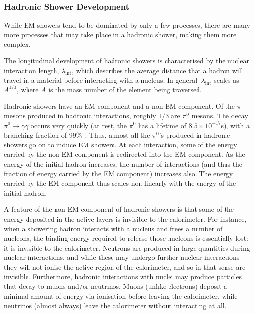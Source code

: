 \subsubsection{Hadronic Shower Development}
\label{detector_had_showers}
While EM showers tend to be dominated by only a few processes, there are many more processes that may take place in a hadronic shower, making them more complex. 

The longitudinal development of hadronic showers is characterised by the nuclear interaction length, $\lambda_\mathrm{int}$, which describes the average distance that a hadron will travel in a material before interacting with a nucleus. In general, $\lambda_\mathrm{int}$ scales as $A^{1/3}$, where $A$ is the mass number of the element being traversed.

Hadronic showers have an EM component and a non-EM component. Of the $\pi$ mesons produced in hadronic interactions, roughly 1/3 are $\pi^0$ mesons. The decay $\pi^0 \rightarrow \gamma \gamma$ occurs very quickly (at rest, the $\pi^0$ has a lifetime of $8.5 \times 10^{-17}$s), with a branching fraction of 99\%~\cite{reviewPP2012}. Thus, almost all the $\pi^0$'s produced in hadronic showers go on to induce EM showers. At each interaction, some of the energy carried by the non-EM component is redirected into the EM component. As the energy of the initial hadron increases, the number of interactions (and thus the fraction of energy carried by the EM component) increases also. The energy carried by the EM component thus scales non-linearly with the energy of the initial hadron. 

A feature of the non-EM component of hadronic showers is that some of the energy deposited in the active layers is invisible to the calorimeter. For instance, when a showering hadron interacts with a nucleus and frees a number of nucleons, the binding energy required to release those nucleons is essentially lost: it is invisible to the calorimeter. Neutrons are produced in large quantities during nuclear interactions, and while these may undergo further nuclear interactions they will not ionise the active region of the calorimeter, and so in that sense are invisible. Furthermore, hadronic interactions with nuclei may produce particles that decay to muons and/or neutrinos. Muons (unlike electrons) deposit a minimal amount of energy via ionisation before leaving the calorimeter, while neutrinos (almost always) leave the calorimeter without interacting at all.

